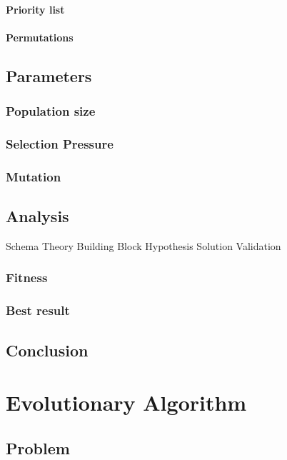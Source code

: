 \documentclass{scrartcl}
\begin{document}
\paragraph{Priority list}
\paragraph{Permutations}

\subsection{Parameters}
\subsubsection{Population size}
\subsubsection{Selection Pressure} 
\subsubsection{Mutation}


\subsection{Analysis}
Schema Theory
Building Block Hypothesis
Solution Validation

\subsubsection{Fitness}

\subsubsection{Best result}

\subsection{Conclusion}




\section{Evolutionary Algorithm}

\subsection{Problem}
\end{document}
